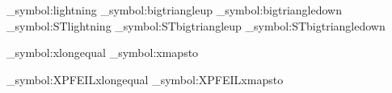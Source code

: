   {}
\ExplSyntaxOn
 \newif\ifST
 \newcommand\ST{\pkgname{stmaryrd}}
  {\STtrue
   \save_symbol:{lightning}
   \save_symbol:{bigtriangleup} \save_symbol:{bigtriangledown}
   \RequirePackage{stmaryrd}
   \restore_symbol:{ST}{lightning}
   \restore_symbol:{ST}{bigtriangleup} \restore_symbol:{ST}{bigtriangledown}
  }
  {}
\ExplSyntaxOff
\ExplSyntaxOn
\newif\ifXPFEIL
\newcommand\XPFEIL{\pkgname{extpfeil}}
  {\XPFEILtrue
   \let\origRequirePackage=\RequirePackage
   \renewcommand*{\RequirePackage}[2][]{}
   \save_symbol:{xlongequal}
   \save_symbol:{xmapsto}
   \RequirePackage{extpfeil}
   \restore_symbol:{XPFEIL}{xlongequal}
   \restore_symbol:{XPFEIL}{xmapsto}
   \let\RequirePackage=\origRequirePackage
  }
  {}
\ExplSyntaxOff
\iffalse
\newif\ifEU
\IfStyFileExists{euscript}
  {\EUtrue\RequirePackage[mathcal]{euscript}
   \renewcommand{\mathcal}[1]{\mbox{\usefont{U}{eus}{m}{n}##1}}
  }
  {\let\CMcal\mathcal}
\fi
  \newif\ifBM
    {\BMtrue
      \RequirePackage{bm}
    }
   {}
\ifUNICODE
 \else
{}
  {\newcommand{\mathbbm}[1]{\mbox{\usefont{U}{bbm}{m}{n}##1}}
   \newcommand{\mathbbmss}[1]{\mbox{\usefont{U}{bbmss}{m}{n}##1}}
   \newcommand{\mathbbmtt}[1]{\mbox{\usefont{U}{bbmtt}{m}{n}##1}}}
  {}
\fi
\ifUNICODE
\else
{}
  {
  \newcommand{\BBmathbb}[1]{\mbox{\usefont{U}{bbold}{m}{n}##1}}
   \newcommand{\BBsym}[1]{\ensuremath{\BBmathbb{\char##1}}}
   \newcommand{\Langle}{\BBsym{`<}}
   \newcommand{\Lbrack}{\BBsym{`[}}
   \newcommand{\Lparen}{\BBsym{`(}}
   \newcommand{\bbalpha}{\BBsym{"0B}}
   \newcommand{\bbbeta}{\BBsym{"0C}}
   \newcommand{\bbgamma}{\BBsym{"0D}}
   \newcommand{\Rparen}{\BBsym{`)}}
   \newcommand{\Rbrack}{\BBsym{`]}}
   \newcommand{\Rangle}{\BBsym{"3E}}
  }
  {}
\fi
{}
  {\newcommand{\MBBmathbb}[1]{\mbox{\usefont{OT1}{mbb}{m}{n}##1}}}
  {}
\ifx\MBBmathbb\undefined
\else
  \newcommand{\bbnabla}{\MBBmathbb{\char"9A}}
  \newcommand{\bbdollar}{\MBBmathbb{\char"24}}
  \newcommand{\bbeuro}{\MBBmathbb{\char"FB}}
  \newcommand{\bbpe}{\MBBmathbb{\char"D4}}
  \newcommand{\bbqof}{\MBBmathbb{\char"D7}}
  \newcommand{\bbyod}{\MBBmathbb{\char"C9}}
  \newcommand{\bbfinalnun}{\MBBmathbb{\char"CF}}

